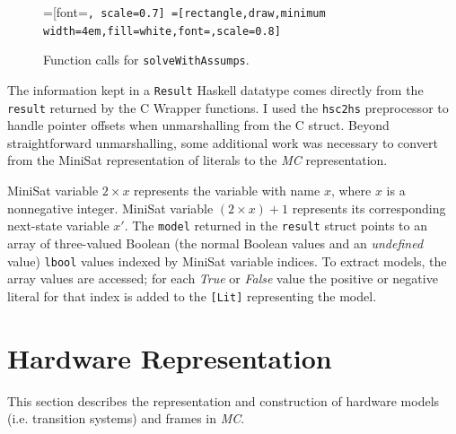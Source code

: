 \documentclass[12pt,a4paper,twoside,openright]{report}
\begin{document}
{{\begin{figure}[t]
\centering
{}=[font=\small\tt, scale=0.7]
=[rectangle,draw,minimum width=4em,fill=white,font=\small\tt,scale=0.8]
\caption{Function calls for {\tt solveWithAssumps}.}
\label{solveWithAssumps}
\end{figure}

The information kept in a \verb,Result, Haskell datatype comes directly from the
\verb,result, returned by the C Wrapper functions.
I used the \verb,hsc2hs, preprocessor to handle pointer offsets
when unmarshalling from the C struct.
Beyond straightforward unmarshalling, some additional work was necessary
to convert from the MiniSat representation of literals to the \emph{MC} representation.

MiniSat variable $2 \times x$ represents the variable with name $x$, where $x$ is a nonnegative
integer. MiniSat variable $(2 \times x) + 1$ represents its corresponding next-state variable
$x'$.
The \verb,model, returned in the \verb,result, struct
points to an array of three-valued Boolean (the normal Boolean values and an
\emph{undefined} value) \verb,lbool, values indexed by MiniSat variable indices.
To extract models, the array values are accessed; for each \emph{True} or \emph{False}
value the positive or negative literal for that index is added to the
\verb,[Lit], representing the model.

\section{Hardware Representation}
\label{impl:representation}
This section describes the representation and construction of hardware models (i.e.
transition systems) and frames in \emph{MC}.
}}
\end{document}
